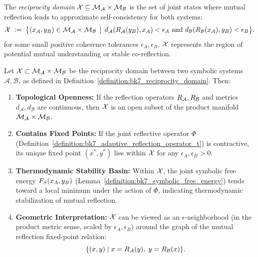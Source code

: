 \begin{definition}
\label{definition:bk7_reciprocity_domain}
The \emph{reciprocity domain} \(\mathcal{X} \subseteq \mathcal{M}_{\mathcal{A}}\times\mathcal{M}_{\mathcal{B}}\) is the set of joint states where mutual reflection leads to approximate self-consistency for both systems:
\[
\mathcal{X}\;:=\;\bigl\{(x_A, y_B) \in \mathcal{M}_{\mathcal{A}}\times\mathcal{M}_{\mathcal{B}} \,\bigm|\, d_{\mathcal{A}}(R_{\mathcal{A}}(y_B), x_A) < \epsilon_A \text{ and } d_{\mathcal{B}}(R_{\mathcal{B}}(x_A), y_B) < \epsilon_B \bigr\}.
\]
for some small positive coherence tolerances \(\epsilon_A, \epsilon_B\). \(\mathcal{X}\) represents the region of potential mutual understanding or stable co-reflection.
\end{definition}
\begin{proposition}
\label{proposition:bk7_structural_properties_of_reciprocity_domain}
Let $\mathcal{X} \subset \mathcal{M}_{\mathcal{A}} \times \mathcal{M}_{\mathcal{B}}$ be the reciprocity domain between two symbolic systems $\mathcal{A}, \mathcal{B}$, as defined in Definition~\ref{definition:bk7_reciprocity_domain}. Then:
\begin{enumerate}
    \item \textbf{Topological Openness:} If the reflection operators \(R_{\mathcal{A}}, R_{\mathcal{B}}\) and metrics \(d_{\mathcal{A}}, d_{\mathcal{B}}\) are continuous, then $\mathcal{X}$ is an open subset of the product manifold \(\mathcal{M}_{\mathcal{A}} \times \mathcal{M}_{\mathcal{B}}\).
    
    \item \textbf{Contains Fixed Points:} If the joint reflective operator $\Phi$ (Definition~\ref{definition:bk7_adaptive_reflection_operator_t}) is contractive, its unique fixed point $(x^*, y^*)$ lies within $\mathcal{X}$ for any $\epsilon_A, \epsilon_B > 0$.
    
    \item \textbf{Thermodynamic Stability Basin:} Within $\mathcal{X}$, the joint symbolic free energy $F_S(x_A, y_B)$ (Lemma~\ref{definition:bk7_symbolic_free_energy}) tends toward a local minimum under the action of $\Phi$, indicating thermodynamic stabilization of mutual reflection.
    
    \item \textbf{Geometric Interpretation:} $\mathcal{X}$ can be viewed as an $\epsilon$-neighborhood (in the product metric sense, scaled by $\epsilon_A, \epsilon_B$) around the graph of the mutual reflection fixed-point relation:
    \[
    \{(x, y) \mid x = R_{\mathcal{A}}(y),\; y = R_{\mathcal{B}}(x)\}.
    \]
    

\end{enumerate}
\end{proposition}
